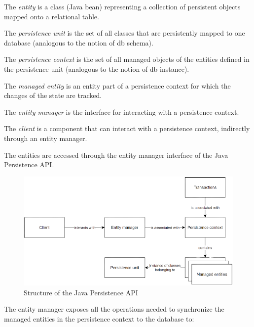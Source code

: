     \begin{definition}
        The \emph{entity} is a class (Java bean) representing a collection of persistent objects mapped onto a relational table. 

        The \emph{persistence unit} is the set of all classes that are persistently mapped to one database (analogous to the notion of db schema). 

        The \emph{persistence context} is the set of all managed objects of the entities defined in the persistence unit (analogous to the notion of db instance). 

        The \emph{managed entity} is an entity part of a persistence context for which the changes of the state are tracked. 

        The \emph{entity manager} is the interface for interacting with a persistence context. 
        
        The \emph{client} is a component that can interact with a persistence context, indirectly through an entity manager.
    \end{definition}
    The entities are accessed through the entity manager interface of the Java Persistence API. 
    \begin{figure}[H]
        \centering
        \includegraphics[width=0.6\linewidth]{images/jpa.png}
        \caption{Structure of the Java Persistence API}
    \end{figure}
    The entity manager exposes all the operations needed to synchronize the managed entities in the persistence context to the database to:
